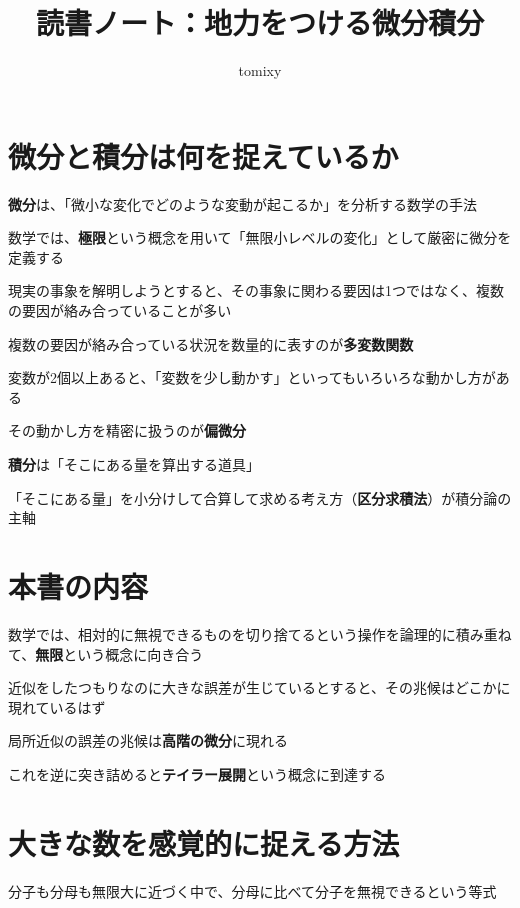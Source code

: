 \documentclass[b5paper,17pt,twocolumn]{jsarticle}
\title{読書ノート：地力をつける微分積分}
\author{tomixy}
\newcommand{\keyword}[1]{\textcolor{RubineRed}{\textbf{#1}}}
\newcommand{\sectionline}{\vspace{-\baselineskip}\froufrou\vspace{-\baselineskip}}
\begin{document}
\maketitle

\section*{微分と積分は何を捉えているか}

\keyword{微分}は、「微小な変化でどのような変動が起こるか」を分析する数学の手法

数学では、\keyword{極限}という概念を用いて「無限小レベルの変化」として厳密に微分を定義する

\sectionline

現実の事象を解明しようとすると、その事象に関わる要因は1つではなく、複数の要因が絡み合っていることが多い

複数の要因が絡み合っている状況を数量的に表すのが\keyword{多変数関数}

\sectionline

変数が2個以上あると、「変数を少し動かす」といってもいろいろな動かし方がある

その動かし方を精密に扱うのが\keyword{偏微分}

\sectionline

\keyword{積分}は「そこにある量を算出する道具」

「そこにある量」を小分けして合算して求める考え方（\keyword{区分求積法}）が積分論の主軸

\section*{本書の内容}

数学では、相対的に無視できるものを切り捨てるという操作を論理的に積み重ねて、\keyword{無限}という概念に向き合う

\sectionline

近似をしたつもりなのに大きな誤差が生じているとすると、その兆候はどこかに現れているはず

局所近似の誤差の兆候は\keyword{高階の微分}に現れる

これを逆に突き詰めると\keyword{テイラー展開}という概念に到達する

\section*{大きな数を感覚的に捉える方法}

分子も分母も無限大に近づく中で、分母に比べて分子を無視できるという等式
\end{document}
